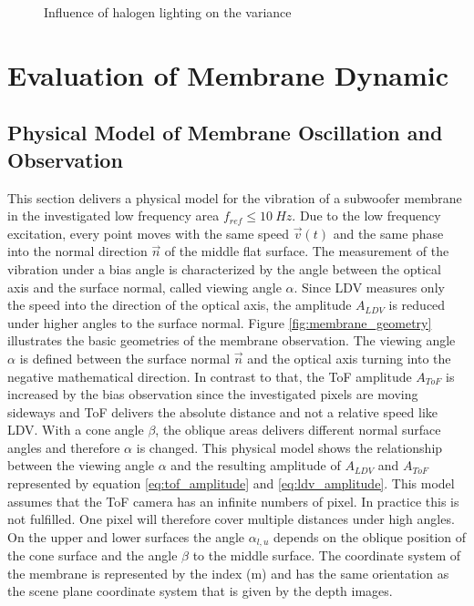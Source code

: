 \begin{figure}[!h]
\hfill
{}
\centering
\caption{Influence of halogen lighting on the variance}
\end{figure}
 
\section{Evaluation of Membrane Dynamic} 
\subsection{Physical Model of Membrane Oscillation and Observation} \label{sec:bias_membrane}
This section delivers a physical model for the vibration of a subwoofer membrane in the investigated low frequency area $f_{ref} \leq 10~Hz$. Due to the low frequency excitation, every point moves with the same speed $\vec{v}(t)$ and the same phase into the normal direction $\vec{n}$ of the middle flat surface.  The measurement of the vibration under a bias angle is characterized by the angle between the optical axis and the surface normal, called viewing angle $\alpha$. Since LDV measures only the speed into the direction of the optical axis, the amplitude $A_{LDV}$ is reduced under higher angles to the surface normal. Figure \ref{fig:membrane_geometry} illustrates the basic geometries of the membrane observation. The viewing angle $\alpha$ is defined between the surface normal $\vec{n}$ and the optical axis turning into the negative mathematical direction. In contrast to that, the ToF amplitude $A_{ToF}$ is increased by the bias observation since the investigated pixels are moving sideways and ToF delivers the absolute distance and not a relative speed like LDV. With a cone angle $\beta$, the oblique areas delivers different normal surface angles and therefore $\alpha$ is changed. This physical model shows the relationship between the viewing angle $\alpha$ and the resulting amplitude of $A_{LDV}$ and $A_{ToF}$ represented by equation \ref{eq:tof_amplitude} and \ref{eq:ldv_amplitude}. This model assumes that the ToF camera has an infinite numbers of pixel. In practice this is not fulfilled. One pixel will therefore cover multiple distances under high angles. On the upper and lower surfaces the angle $\alpha_{l,u}$ depends on the oblique position of the cone surface and the angle $\beta$ to the middle surface. The coordinate system of the membrane is represented by the index (m) and has the same orientation as the scene plane coordinate system that is given by the depth images.  
  
